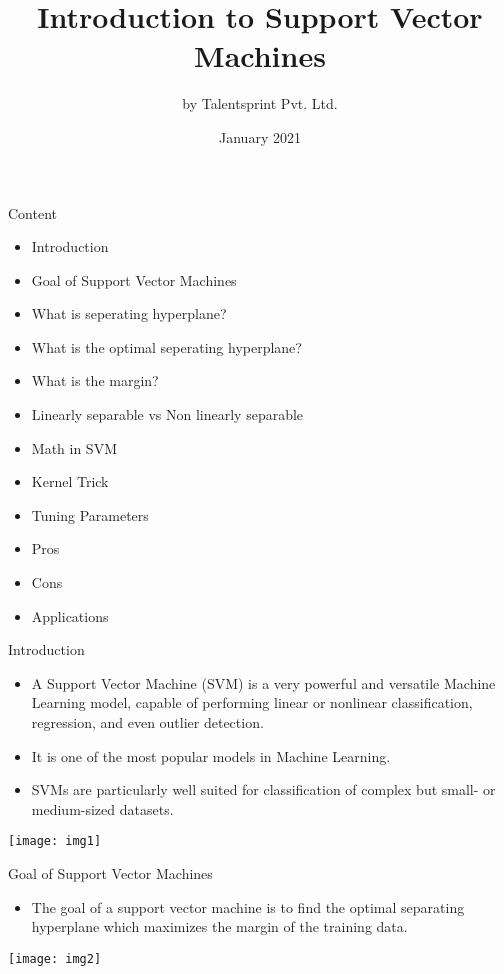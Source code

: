 \documentclass{beamer}
\title{Introduction to Support Vector Machines}
\author{by Talentsprint Pvt. Ltd.}
\date{January 2021}
\begin{document}
\maketitle
\begin{frame}{Content}
	\begin{itemize}
		\item Introduction
		\item Goal of Support Vector Machines
		\item What is seperating hyperplane?
		\item What is the optimal seperating hyperplane?
		\item What is the margin?
		\item Linearly separable vs Non linearly separable
		\item Math in SVM
		\item Kernel Trick
		\item Tuning Parameters
		\item Pros
		\item Cons
		\item Applications
	\end{itemize}
\end{frame}

\begin{frame}{Introduction}
	\begin{flushleft}
		\begin{itemize}
			\item A Support Vector Machine (SVM) is a very powerful and versatile Machine Learning
model, capable of performing linear or nonlinear classification, regression, and even
outlier detection. 
			\item It is one of the most popular models in Machine Learning.
			\item SVMs are particularly well suited for classification of complex but small- or medium-sized datasets.
		\end{itemize}
	\end{flushleft}
	\texttt{[image: img1]}
\end{frame}

\begin{frame}{Goal of Support Vector Machines}
\begin{flushleft}
\begin{itemize}
	\item The goal of a support vector machine is to find  the optimal separating hyperplane which maximizes the margin of the training data.
\end{itemize}
\end{flushleft}
\texttt{[image: img2]}
\end{frame}
\end{document}
